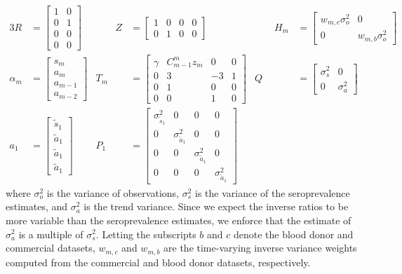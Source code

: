 \documentclass{article}
\begin{document}
\begin{alignat*}{3}
R &= \begin{bmatrix}
1 & 0  \\ 
0 & 1 \\ 
0 & 0 \\ 
0 & 0 
\end{bmatrix} &\qquad 
Z &= \begin{bmatrix}
1 & 0 & 0 & 0 \\ 
0 & 1 & 0 & 0 
\end{bmatrix} &\qquad 
H_m &= \begin{bmatrix} %
w_{m,c}\sigma^2_o & 0 \\ 
0 & w_{m,b}\sigma^2_o
\end{bmatrix} \\
\alpha_m &= \begin{bmatrix}
s_{m}\\
a_m\\ 
a_{m-1}\\ 
a_{m-2}
\end{bmatrix} & 
T_m &= \begin{bmatrix}
 \gamma & C_{m-1}^m z_m & 0 & 0\\ 
 0 & 3 & -3 & 1 \\ 
 0 & 1 & 0 & 0\\ 
 0 & 0 & 1 & 0
\end{bmatrix}  & 
Q &= \begin{bmatrix} 
\sigma^2_s & 0  \\ 
0 & \sigma^2_a
\end{bmatrix} \\
a_1 &= \begin{bmatrix}
\tilde{s}_{1}\\ 
\tilde{a}_1\\ 
\tilde{a}_1 \\
\tilde{a}_1
\end{bmatrix} & 
P_{1} &= \begin{bmatrix}
\sigma^2_{\tilde{s}_{1}} & 0 & 0 & 0 \\ 
0 & \sigma^2_{\tilde{a}_1} & 0 & 0\\ 
0 & 0 & \sigma^2_{\tilde{a}_1} & 0 \\ 
0 & 0 & 0 & \sigma^2_{\tilde{a}_1}
\end{bmatrix} 
\end{alignat*}
where $\sigma^2_o$ is the variance of observations,
$\sigma^2_s$ is the variance of the seroprevalence estimates, 
and $\sigma^2_a$ is the trend variance. Since we expect the 
inverse ratios to be more variable than the seroprevalence estimates, 
we enforce that the estimate of $\sigma^2_a$ is a multiple of 
$\sigma^2_s$. Letting the subscripts $b$ and $c$ denote
the blood donor and commercial datasets, $w_{m,c}$ and $w_{m,b}$ are the
time-varying inverse variance weights computed from the commercial and blood
donor datasets, respectively. 
\end{document}
